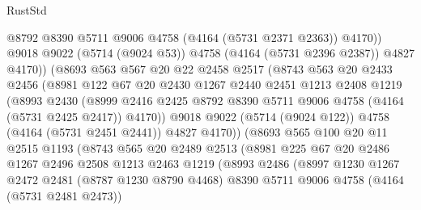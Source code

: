 \begin{lexlean}{RustStd}
\begin{coremodule}
                      @8792
                      @8390
                      @5711
                      @9006
                      @4758
                      (@4164 (@5731 @2371 @2363))
                      @4170))
                  @9018
                  @9022
                  (@5714 (@9024 @53))
                  @4758
                  (@4164 (@5731 @2396 @2387))
                  @4827
                  @4170))
              (@8693
                @563
                @567
                @20
                @22
                @2458
                @2517
                (@8743
                  @563
                  @20
                  @2433
                  @2456
                  (@8981
                    @122
                    @67
                    @20
                    @2430
                    @1267
                    @2440
                    @2451
                    @1213
                    @2408
                    @1219
                    (@8993
                      @2430
                      (@8999
                        @2416
                        @2425
                        @8792
                        @8390
                        @5711
                        @9006
                        @4758
                        (@4164 (@5731 @2425 @2417))
                        @4170))
                    @9018
                    @9022
                    (@5714 (@9024 @122))
                    @4758
                    (@4164 (@5731 @2451 @2441))
                    @4827
                    @4170))
                (@8693
                  @565
                  @100
                  @20
                  @11
                  @2515
                  @1193
                  (@8743
                    @565
                    @20
                    @2489
                    @2513
                    (@8981
                      @225
                      @67
                      @20
                      @2486
                      @1267
                      @2496
                      @2508
                      @1213
                      @2463
                      @1219
                      (@8993
                        @2486
                        (@8997
                          @1230
                          @1267
                          @2472
                          @2481
                          (@8787 @1230 @8790 @4468)
                          @8390
                          @5711
                          @9006
                          @4758
                          (@4164 (@5731 @2481 @2473))

\end{coremodule}
\end{lexlean}
